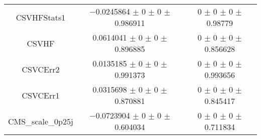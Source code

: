\begin{table}
\begin{tabular}{ccc}
CSVHFStats1 	& \num{-0.0245864} $\pm$ \num{0} $\pm$ \num{0} $\pm$ \num{0.986911} 	& \num{0} $\pm$ \num{0} $\pm$ \num{0} $\pm$ \num{0.98779}\\
CSVHF 	& \num{0.0614041} $\pm$ \num{0} $\pm$ \num{0} $\pm$ \num{0.896885} 	& \num{0} $\pm$ \num{0} $\pm$ \num{0} $\pm$ \num{0.856628}\\
CSVCErr2 	& \num{0.0135185} $\pm$ \num{0} $\pm$ \num{0} $\pm$ \num{0.991373} 	& \num{0} $\pm$ \num{0} $\pm$ \num{0} $\pm$ \num{0.993656}\\
CSVCErr1 	& \num{0.0315698} $\pm$ \num{0} $\pm$ \num{0} $\pm$ \num{0.870881} 	& \num{0} $\pm$ \num{0} $\pm$ \num{0} $\pm$ \num{0.845417}\\
CMS\_scale\_0p25j 	& \num{-0.0723904} $\pm$ \num{0} $\pm$ \num{0} $\pm$ \num{0.604034} 	& \num{0} $\pm$ \num{0} $\pm$ \num{0} $\pm$ \num{0.711834}\\
\bottomrule
\end{tabular}
\end{table}